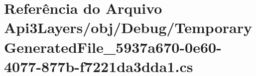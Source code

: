 \hypertarget{Api3Layers_2obj_2Debug_2TemporaryGeneratedFile__5937a670-0e60-4077-877b-f7221da3dda1_8cs}{}\section{Referência do Arquivo Api3\+Layers/obj/\+Debug/\+Temporary\+Generated\+File\+\_\+5937a670-\/0e60-\/4077-\/877b-\/f7221da3dda1.cs}
\label{Api3Layers_2obj_2Debug_2TemporaryGeneratedFile__5937a670-0e60-4077-877b-f7221da3dda1_8cs}
